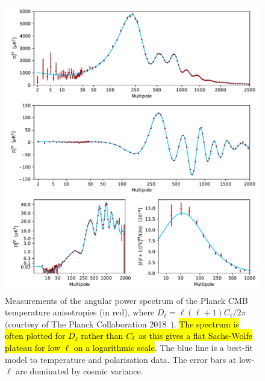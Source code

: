 \begin{figure}[htpb]
	\centering\capstart{}
	\includegraphics[trim={0 430 0 0},clip,width=\textwidth]{planck_2018_power_spectrum.pdf}
	\caption[
	The 2018 Planck CMB angular power spectrum in temperature
	]{
	Measurements of the angular power spectrum of the Planck CMB temperature anisotropies (in red), where \(D_{\ell} = \ell(\ell+1)C_{\ell}/2\pi{}\) (courtesy of The Planck Collaboration 2018~\cite{Planck2020}).
	\hl{The spectrum is often plotted for \mbox{\(D_{\ell}\)} rather than \mbox{\(C_{\ell}{}\)} as this gives a flat Sachs-Wolfe plateau for low \mbox{\(\ell{}\)} on a logarithmic scale}.
	The blue line is a best-fit model to temperature and polarisation data.
	The error bars at low-\(\ell{}\) are dominated by cosmic variance.
	}\label{fig:chapter2_power_spectrum}
\end{figure}
